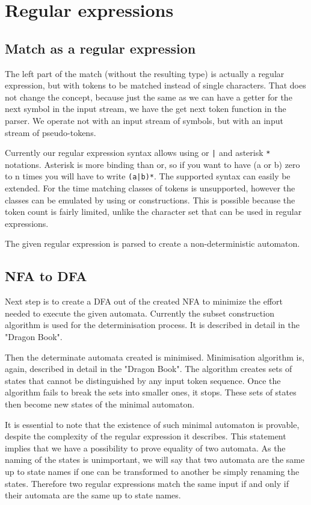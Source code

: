 \section{\label{sec:regexps}Regular expressions}

\subsection{Match as a regular expression}
The left part of the match (without the resulting type) is actually a
regular expression, but with tokens to be matched instead of single
characters. That does not change the concept, because just the same as
we can have a getter for the next symbol in the input stream, we have
the get next token function in the parser. We operate not with an input
stream of symbols, but with an input stream of pseudo-tokens.

Currently our regular expression syntax allows using or \verb/|/ and asterisk
\verb|*| notations. Asterisk is more binding than or, so if you want to have (a
or b) zero to n times you will have to write \verb/(a|b)*/. The supported
syntax can easily be extended.  For the time matching classes of tokens is
unsupported, however the classes can be emulated by using or constructions.
This is possible because the token count is fairly limited, unlike the
character set that can be used in regular expressions.

The given regular expression is parsed to create a non-deterministic automaton.

\subsection{NFA to DFA}
Next step is to create a DFA out of the created NFA to minimize the effort
needed to execute the given automata. Currently the subset construction
algorithm is used for the determinisation process. It is described in detail in
the "Dragon Book".

Then the determinate automata created is minimised. Minimisation algorithm is,
again, described in detail in the "Dragon Book". The algorithm creates sets of
states that cannot be distinguished by any input token sequence. Once the
algorithm fails to break the sets into smaller ones, it stops. These sets of
states then become new states of the minimal automaton.

It is essential to note that the existence of such minimal automaton is
provable, despite the complexity of the regular expression it describes. This
statement implies that we have a possibility to prove equality of two automata.
As the naming of the states is unimportant, we will say that two automata are
the same up to state names if one can be transformed to another be simply
renaming the states. Therefore two regular expressions match the same input if
and only if their automata are the same up to state names.

